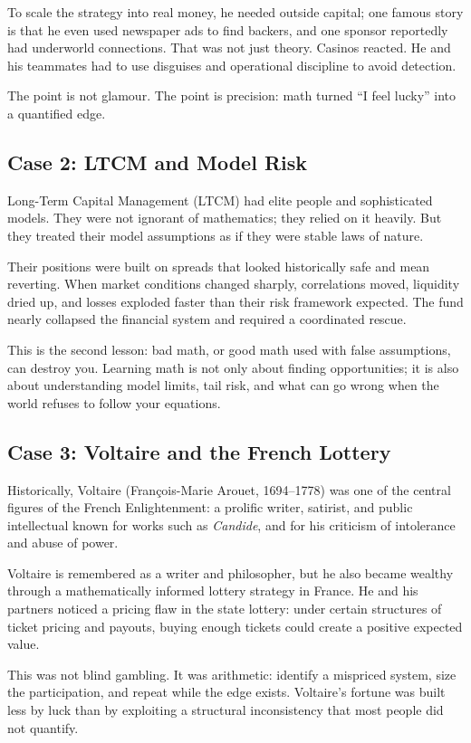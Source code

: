 To scale the strategy
into real money, he needed outside capital; one famous story is that he even
used newspaper ads to find backers, and one sponsor reportedly had underworld
connections. That was not just theory.  Casinos reacted.  He and his teammates had to use
disguises and operational discipline to avoid detection.  

The point is not glamour.  The point is precision: math turned ``I feel lucky''
into a quantified edge.

\subsection*{Case 2: LTCM and Model Risk}
Long-Term Capital Management (LTCM) had elite people and sophisticated models.
They were not ignorant of mathematics; they relied on it heavily.  But they
treated their model assumptions as if they were stable laws of nature.

Their positions were built on spreads that looked historically safe and mean
reverting.  When market conditions changed sharply, correlations moved, liquidity
dried up, and losses exploded faster than their risk framework expected.  The
fund nearly collapsed the financial system and required a coordinated rescue.

This is the second lesson: bad math, or good math used with false assumptions,
can destroy you.  Learning math is not only about finding opportunities; it is
also about understanding model limits, tail risk, and what can go wrong when
the world refuses to follow your equations.

\subsection*{Case 3: Voltaire and the French Lottery}
Historically, Voltaire (Fran\c{c}ois-Marie Arouet, 1694--1778) was one of the
central figures of the French Enlightenment: a prolific writer, satirist, and
public intellectual known for works such as \emph{Candide}, and for his
criticism of intolerance and abuse of power.

Voltaire is remembered as a writer and philosopher, but he also became wealthy
through a mathematically informed lottery strategy in France.  He and his
partners noticed a pricing flaw in the state lottery: under certain structures
of ticket pricing and payouts, buying enough tickets could create a positive
expected value.

This was not blind gambling.  It was arithmetic: identify a mispriced system,
size the participation, and repeat while the edge exists.  Voltaire's fortune
was built less by luck than by exploiting a structural inconsistency that most
people did not quantify.


